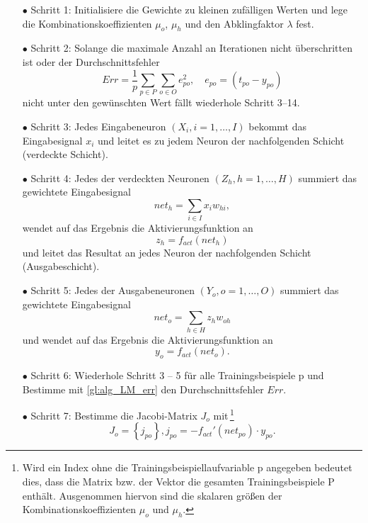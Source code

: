 \begin{itemize}
\item[\textbf{$\bullet$}] Schritt 1: Initialisiere die Gewichte zu kleinen zufälligen Werten und lege die Kombinationskoeffizienten $\mu_o$, $\mu_h$ und den Abklingfaktor $\lambda$ fest.

\item[\textbf{$\bullet$}] Schritt 2: Solange die maximale Anzahl an Iterationen nicht überschritten ist oder der Durchschnittsfehler
\begin{equation}
Err= \frac{1}{p} \sum\limits_{p \in P} \sum\limits_{o \in O} e_{po}^2, \quad e_{po}=(t_{po}-y_{po})
\label{gl:alg_LM_err}
\end{equation}
nicht unter den gewünschten Wert fällt wiederhole Schritt 3--14.

\item[\textbf{$\bullet$}] Schritt 3: Jedes Eingabeneuron $(X_{i}, i=1,\dots,I)$ bekommt das Eingabesignal $x_{i}$ und leitet es zu jedem Neuron der nachfolgenden Schicht (verdeckte Schicht).

\item[\textbf{$\bullet$}] Schritt 4: Jedes der verdeckten Neuronen $(Z_{h}, h=1,\dots,H)$ summiert das gewichtete Eingabesignal
\begin{equation}
net_{h}=\sum\limits_{i \in I} x_{i}w_{hi},
\end{equation}
wendet auf das Ergebnis die Aktivierungsfunktion an 
\begin{equation}
z_{h}=f_{act}(net_{h})
\end{equation}
und leitet das Resultat an jedes Neuron der nachfolgenden Schicht (Ausgabeschicht).

\item[\textbf{$\bullet$}] Schritt 5: Jedes der Ausgabeneuronen $(Y_{o}, o=1,\dots,O)$ summiert das gewichtete Eingabesignal 
\begin{equation}
net_{o}=\sum\limits_{h \in H} z_{h}w_{oh}
\end{equation}
und wendet auf das Ergebnis die Aktivierungsfunktion an 
\begin{equation}
y_{o}=f_{act}(net_{o}).
\end{equation}

\item[\textbf{$\bullet$}] Schritt 6: Wiederhole Schritt 3 -- 5 für alle Trainingsbeispiele p und Bestimme mit \autoref{gl:alg_LM_err} den Durchschnittsfehler $Err$.

\item[\textbf{$\bullet$}] Schritt 7: Bestimme die Jacobi-Matrix $J_{o}$ mit\,\footnote{Wird ein Index ohne die Trainingsbeispiellaufvariable p angegeben bedeutet dies, dass die Matrix bzw. der Vektor die gesamten Trainingsbeispiele P enthält. Ausgenommen hiervon sind die skalaren größen der Kombinationskoeffizienten $\mu_o$ und $\mu_h$.}
\begin{equation}
J_{o}= \left \{ j_{po} \right \}, j_{po}=-f_{act}'(net_{po}) \cdot y_{po}.
\end{equation}


\end{itemize}
